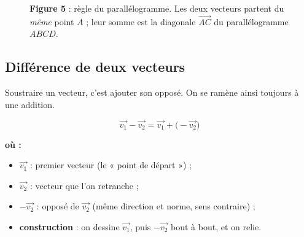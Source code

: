 \documentclass[11pt,a4paper]{article}
\newenvironment{ou}{%
  \par\smallskip\noindent\textbf{où :}\nopagebreak
  \begin{itemize}[leftmargin=1.8em,topsep=2pt,itemsep=1.5pt,parsep=0pt]}%
  {\end{itemize}}
\newcommand{\vc}[1]{\overrightarrow{#1}}        %
\begin{document}
\begin{figure}[h]
\centering
{}
\caption{\textbf{\textcolor{primary}{Figure 5}} : règle du parallélogramme. Les deux vecteurs partent du
\emph{même} point $A$ ; leur somme est la diagonale $\vc{AC}$ du parallélogramme $ABCD$.}
\label{fig:parallelo}
\end{figure}

\subsection{Différence de deux vecteurs}

Soustraire un vecteur, c'est ajouter son opposé. On se ramène ainsi toujours à une addition.

\begin{formule}
\[
  \boxed{\;\vec{v_1}-\vec{v_2}=\vec{v_1}+\bigl(-\vec{v_2}\bigr)\;}
\]
\begin{ou}
  \item $\vec{v_1}$ : premier vecteur (le « point de départ ») ;
  \item $\vec{v_2}$ : vecteur que l'on retranche ;
  \item $-\vec{v_2}$ : opposé de $\vec{v_2}$ (même direction et norme, sens contraire) ;
  \item \textbf{construction} : on dessine $\vec{v_1}$, puis $-\vec{v_2}$ bout à bout, et on relie.
\end{ou}
\end{formule}
\end{document}
